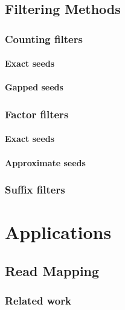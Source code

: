 \chapter{Filtering Methods}
\section{Counting filters}
\subsection{Exact seeds}
\subsection{Gapped seeds}
\section{Factor filters}
\subsection{Exact seeds}
\subsection{Approximate seeds}
\section{Suffix filters}


\part{Applications}

\chapter{Read Mapping}
\section{Related work}
